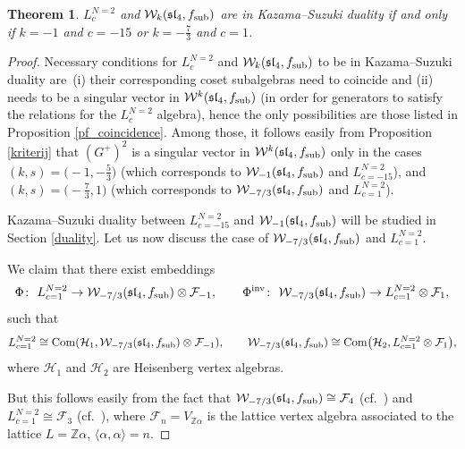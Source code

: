 \documentclass[pdftex]{sigma}
\numberwithin{equation}{section}
\newcommand{\Z}{\mathbb Z}
\newcommand{\F}{\mathcal F}
\newtheorem{Theorem}{Theorem}[section]
\begin{document}
\begin{Theorem}
	$L^{N=2}_c$ and $\mathcal W_k(\mathfrak{sl}_4, f_{\rm sub})$ are in Kazama--Suzuki duality if and only if $k=-1$ and $c=-15$ or $k=-\frac{7}{3}$ and $c=1$.
\end{Theorem}
\begin{proof}
Necessary conditions for $L^{N=2}_c$ and $\mathcal W_k(\mathfrak{sl}_4, f_{\rm sub})$ to be in Kazama--Suzuki duality are~(i) their corresponding coset subalgebras need to coincide and (ii)  needs to be a singular vector in $\mathcal W^k(\mathfrak{sl}_4, f_{\rm sub})$ \big(in order for generators to satisfy the relations for the $L^{N=2}_c$ algebra\big),
 hence the only possibilities are those listed in Proposition \ref{pf_coincidence}. Among those, it follows easily from Proposition \ref{kriterij} that $(G^+)^2$ is a singular vector in $\mathcal W^k(\mathfrak{sl}_4, f_{\rm sub})$ only in the cases $(k,s) = \bigl(-1,-\frac{5}{3}\bigr)$ \big(which corresponds to $\mathcal W_{-1}(\mathfrak{sl}_4, f_{\rm sub})$ and $L^{{N=2}}_{c=-15}$\big), and $(k,s) = \bigl(-\frac{7}{3}, 1\bigr)$ \big(which corresponds to $\mathcal W_{-7/3}(\mathfrak{sl}_4, f_{\rm sub})$ and $L^{N=2}_{c=1}$\big).

Kazama--Suzuki duality between $L^{N=2}_{c=-15}$ and $\mathcal W_{-1}(\mathfrak{sl}_4, f_{\rm sub})$ will be studied in Section \ref{duality}. Let us now discuss the case of $\mathcal W_{-7/3}(\mathfrak{sl}_4, f_{\rm sub})$ and $L^{N=2}_{c=1}$.

We claim that there exist embeddings
\[
\Phi\colon\ L^{N=2}_{c=1} \rightarrow \mathcal{W}_{-7/3}(\mathfrak{sl}_4, f_{\rm sub}) \otimes \F_{-1}, \qquad \Phi^{\rm inv} \colon\ \mathcal{W}_{-7/3}(\mathfrak{sl}_4, f_{\rm sub}) \rightarrow L^{N=2}_{c=1} \otimes \F_{1},
\]
such that
 \begin{align*}
 	L^{N=2}_{c=1} \cong \operatorname{Com} (\mathcal{H}_1, \mathcal{W}_{-7/3}(\mathfrak{sl}_4, f_{\rm sub}) \otimes \F_{-1}), \qquad
 	\mathcal{W}_{-7/3}(\mathfrak{sl}_4, f_{\rm sub}) \cong \operatorname{Com} \bigl(\mathcal{H}_2, L^{N=2}_{c=1} \otimes \F_{1}\bigr),
 \end{align*}
 where $\mathcal{H}_1$ and $\mathcal{H}_2$ are Heisenberg vertex algebras.

But this follows easily from the fact that $\mathcal{W}_{-7/3}(\mathfrak{sl}_4, f_{\rm sub}) \cong \F_4$ (cf.\ \cite{CFLN}) and $ L^{N=2}_{c=1} \cong \F_3$ (cf.~\cite{K1}), where $\F_n = V_{\mathbb{Z}\alpha}$ is the lattice vertex algebra associated to the lattice $L= {\Z}\alpha $, $\langle \alpha , \alpha \rangle = n$.
\end{proof}
\end{document}
